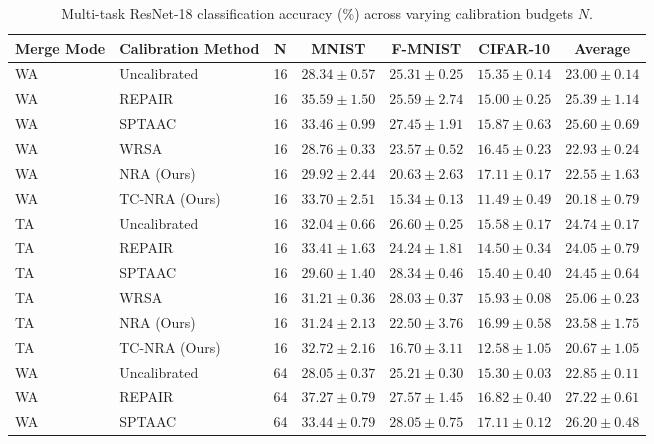 \documentclass{article}
\theoremstyle{plain}
\theoremstyle{definition}
\theoremstyle{remark}
\begin{document}
\begin{table}[t]
\caption{Multi-task ResNet-18 classification accuracy (\%) across varying calibration budgets $N$.}
\label{results-table}
\begin{center}
\begin{small}
\begin{tabular}{llccccc}
\toprule
Merge Mode & Calibration Method & N & MNIST & F-MNIST & CIFAR-10 & Average \\
\midrule
WA & Uncalibrated & 16 & $28.34 \pm 0.57$ & $25.31 \pm 0.25$ & $15.35 \pm 0.14$ & $23.00 \pm 0.14$ \\
WA & REPAIR & 16 & $35.59 \pm 1.50$ & $25.59 \pm 2.74$ & $15.00 \pm 0.25$ & $25.39 \pm 1.14$ \\
WA & SPTAAC & 16 & $33.46 \pm 0.99$ & $27.45 \pm 1.91$ & $15.87 \pm 0.63$ & $25.60 \pm 0.69$ \\
WA & WRSA & 16 & $28.76 \pm 0.33$ & $23.57 \pm 0.52$ & $16.45 \pm 0.23$ & $22.93 \pm 0.24$ \\
WA & NRA (Ours) & 16 & $29.92 \pm 2.44$ & $20.63 \pm 2.63$ & $17.11 \pm 0.17$ & $22.55 \pm 1.63$ \\
WA & TC-NRA (Ours) & 16 & $33.70 \pm 2.51$ & $15.34 \pm 0.13$ & $11.49 \pm 0.49$ & $20.18 \pm 0.79$ \\
\midrule
TA & Uncalibrated & 16 & $32.04 \pm 0.66$ & $26.60 \pm 0.25$ & $15.58 \pm 0.17$ & $24.74 \pm 0.17$ \\
TA & REPAIR & 16 & $33.41 \pm 1.63$ & $24.24 \pm 1.81$ & $14.50 \pm 0.34$ & $24.05 \pm 0.79$ \\
TA & SPTAAC & 16 & $29.60 \pm 1.40$ & $28.34 \pm 0.46$ & $15.40 \pm 0.40$ & $24.45 \pm 0.64$ \\
TA & WRSA & 16 & $31.21 \pm 0.36$ & $28.03 \pm 0.37$ & $15.93 \pm 0.08$ & $25.06 \pm 0.23$ \\
TA & NRA (Ours) & 16 & $31.24 \pm 2.13$ & $22.50 \pm 3.76$ & $16.99 \pm 0.58$ & $23.58 \pm 1.75$ \\
TA & TC-NRA (Ours) & 16 & $32.72 \pm 2.16$ & $16.70 \pm 3.11$ & $12.58 \pm 1.05$ & $20.67 \pm 1.05$ \\
\midrule
WA & Uncalibrated & 64 & $28.05 \pm 0.37$ & $25.21 \pm 0.30$ & $15.30 \pm 0.03$ & $22.85 \pm 0.11$ \\
WA & REPAIR & 64 & $\mathbf{37.27 \pm 0.79}$ & $27.57 \pm 1.45$ & $16.82 \pm 0.40$ & $\mathbf{27.22 \pm 0.61}$ \\
WA & SPTAAC & 64 & $33.44 \pm 0.79$ & $28.05 \pm 0.75$ & $17.11 \pm 0.12$ & $26.20 \pm 0.48$ \\

\end{tabular}
\end{small}
\end{center}
\end{table}
\end{document}

